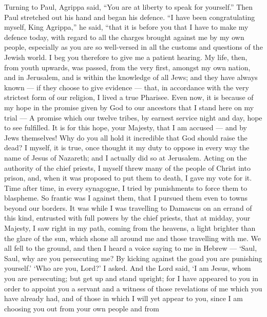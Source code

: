  Turning to Paul, Agrippa said, ``You are at liberty to
speak for yourself.'' Then Paul stretched out his hand and began his
defence.  ``I have been congratulating myself, King
Agrippa,'' he said, ``that it is before you that I have to make my
defence today, with regard to all the charges brought against me by my
own people,  especially as you are so well-versed in all the
customs and questions of the Jewish world. I beg you therefore to give
me a patient hearing.  My life, then, from youth upwards,
was passed, from the very first, amongst my own nation, and in
Jerusalem, and is within the knowledge of all Jews;  and
they have always known --- if they choose to give evidence --- that, in
accordance with the very strictest form of our religion, I lived a true
Pharisee.  Even now, it is because of my hope in the promise
given by God to our ancestors that I stand here on my trial ---
 A promise which our twelve tribes, by earnest service night
and day, hope to see fulfilled. It is for this hope, your Majesty, that
I am accused --- and by Jews themselves!  Why do you all
hold it incredible that God should raise the dead?  I
myself, it is true, once thought it my duty to oppose in every way the
name of Jesus of Nazareth;  and I actually did so at
Jerusalem. Acting on the authority of the chief priests, I myself threw
many of the people of Christ into prison, and, when it was proposed to
put them to death, I gave my vote for it.  Time after time,
in every synagogue, I tried by punishments to force them to blaspheme.
So frantic was I against them, that I pursued them even to towns beyond
our borders.  It was while I was travelling to Damascus on
an errand of this kind, entrusted with full powers by the chief priests,
 that at midday, your Majesty, I saw right in my path,
coming from the heavens, a light brighter than the glare of the sun,
which shone all around me and those travelling with me.  We
all fell to the ground, and then I heard a voice saying to me in Hebrew
--- `Saul, Saul, why are you persecuting me? By kicking against the goad
you are punishing yourself.'  `Who are you, Lord?' I asked.
And the Lord said, `I am Jesus, whom you are persecuting; 
but get up and stand upright; for I have appeared to you in order to
appoint you a servant and a witness of those revelations of me which you
have already had, and of those in which I will yet appear to you,
 since I am choosing you out from your own people and from
